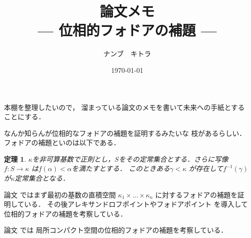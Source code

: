\documentclass[leqno, a4paper, 12pt]{jsarticle}
\title{論文メモ
\large{\\--- 位相的フォドアの補題 ---}
}
\author{ナンブ　キトラ}
\date{\today}
\newtheorem{thm}{定理}
\begin{document}
\maketitle

本棚を整理したいので，
溜まっている論文のメモを書いて未来への手紙とすることにする．


なんか知らんが位相的なフォドアの補題を証明するみたいな
枝があるらしい．
フォドアの補題といのは以下である．
\begin{thm}
$\kappa$を非可算基数で正則とし，$S$をその定常集合とする．さらに写像$f\colon S\to \kappa$
は$f(\alpha)<\alpha$を満たすとする．
このときある$\gamma<\kappa$
が存在して$f^{-1}(\gamma)$
が$\kappa$定常集合となる．
\end{thm}

論文
\cite{MR0786473}
ではまず最初の基数の直積空間
$\kappa_{1}\times \dots \times \kappa_{n}$
に対するフォドアの補題を証明している．
その後アレキサンドロフポイントやフォドアポイント
を導入して位相的フォドアの補題を考察している．

論文
\cite{MR2223392}
では
局所コンパクト空間の位相的フォドアの補題を考察している．
\nocite{*}


\end{document}

